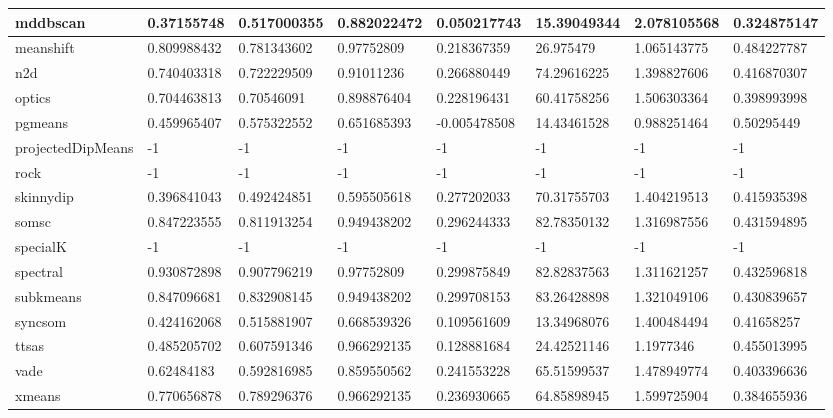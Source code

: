 \begin{table}[H]
\begin{tabular}{|l|l|l|l|l|l|l|l|}
\hline
mddbscan & 0.37155748 & 0.517000355 & 0.882022472 & 0.050217743 & 15.39049344 & 2.078105568 & 0.324875147 \\
\hline
meanshift & 0.809988432 & 0.781343602 & 0.97752809 & 0.218367359 & 26.975479 & 1.065143775 & 0.484227787 \\
\hline
n2d & 0.740403318 & 0.722229509 & 0.91011236 & 0.266880449 & 74.29616225 & 1.398827606 & 0.416870307 \\
\hline
optics & 0.704463813 & 0.70546091 & 0.898876404 & 0.228196431 & 60.41758256 & 1.506303364 & 0.398993998 \\
\hline
pgmeans & 0.459965407 & 0.575322552 & 0.651685393 & -0.005478508 & 14.43461528 & 0.988251464 & 0.50295449 \\
\hline
projectedDipMeans & -1 & -1 & -1 & -1 & -1 & -1 & -1 \\
\hline
rock & -1 & -1 & -1 & -1 & -1 & -1 & -1 \\
\hline
skinnydip & 0.396841043 & 0.492424851 & 0.595505618 & 0.277202033 & 70.31755703 & 1.404219513 & 0.415935398 \\
\hline
somsc & 0.847223555 & 0.811913254 & 0.949438202 & 0.296244333 & 82.78350132 & 1.316987556 & 0.431594895 \\
\hline
specialK & -1 & -1 & -1 & -1 & -1 & -1 & -1 \\
\hline
spectral & 0.930872898 & 0.907796219 & 0.97752809 & 0.299875849 & 82.82837563 & 1.311621257 & 0.432596818 \\
\hline
subkmeans & 0.847096681 & 0.832908145 & 0.949438202 & 0.299708153 & 83.26428898 & 1.321049106 & 0.430839657 \\
\hline
syncsom & 0.424162068 & 0.515881907 & 0.668539326 & 0.109561609 & 13.34968076 & 1.400484494 & 0.41658257 \\
\hline
ttsas & 0.485205702 & 0.607591346 & 0.966292135 & 0.128881684 & 24.42521146 & 1.1977346 & 0.455013995 \\
\hline
vade & 0.62484183 & 0.592816985 & 0.859550562 & 0.241553228 & 65.51599537 & 1.478949774 & 0.403396636 \\
\hline
xmeans & 0.770656878 & 0.789296376 & 0.966292135 & 0.236930665 & 64.85898945 & 1.599725904 & 0.384655936 \\
\hline
\end{tabular}
\end{table}

\clearpage

